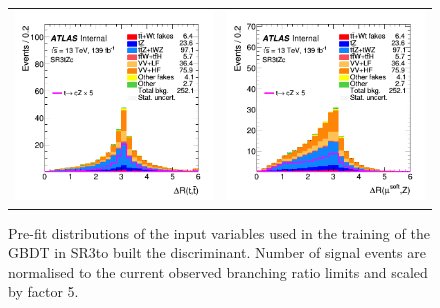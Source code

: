 \begin{figure}[htbp]
\begin{tabular}{cc}
		\includegraphics[width=.45\textwidth]{Chapters/CH6/figures/SR3_UsingSMT/ttbar_dR} &
		\includegraphics[width=.45\textwidth]{Chapters/CH6/figures/SR3_UsingSMT/softmuZ_dR} \\
	\end{tabular}
	\caption{Pre-fit distributions of the input variables used in the training of the GBDT in SR3\tZc to built the \Dthree discriminant. Number of signal events are normalised to the current observed branching ratio limits and scaled by factor 5.  
		\ErrStatOnly
		\Blinded
	}%
	\label{fig:separation:SR3}
\end{figure}

